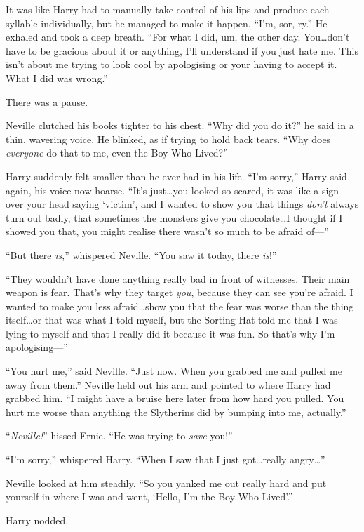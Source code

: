 It was like Harry had to manually take control of his lips and produce each syllable individually, but he managed to make it happen. “I’m, sor, ry.” He exhaled and took a deep breath. “For what I did, um, the other day. You…don’t have to be gracious about it or anything, I’ll understand if you just hate me. This isn’t about me trying to look cool by apologising or your having to accept it. What I did was wrong.”

There was a pause.

Neville clutched his books tighter to his chest. “Why did you do it?” he said in a thin, wavering voice. He blinked, as if trying to hold back tears. “Why does \emph{everyone} do that to me, even the Boy-Who-Lived?”

Harry suddenly felt smaller than he ever had in his life. “I’m sorry,” Harry said again, his voice now hoarse. “It’s just…you looked so scared, it was like a sign over your head saying ‘victim’, and I wanted to show you that things \emph{don’t} always turn out badly, that sometimes the monsters give you chocolate…I thought if I showed you that, you might realise there wasn’t so much to be afraid of—”

“But there \emph{is},” whispered Neville. “You saw it today, there \emph{is}!”

“They wouldn’t have done anything really bad in front of witnesses. Their main weapon is fear. That’s why they target \emph{you}, because they can see you’re afraid. I wanted to make you less afraid…show you that the fear was worse than the thing itself…or that was what I told myself, but the Sorting Hat told me that I was lying to myself and that I really did it because it was fun. So that’s why I’m apologising—”

“You hurt me,” said Neville. “Just now. When you grabbed me and pulled me away from them.” Neville held out his arm and pointed to where Harry had grabbed him. “I might have a bruise here later from how hard you pulled. You hurt me worse than anything the Slytherins did by bumping into me, actually.”

“\emph{Neville!}” hissed Ernie. “He was trying to \emph{save} you!”

“I’m sorry,” whispered Harry. “When I saw that I just got…really angry…”

Neville looked at him steadily. “So you yanked me out really hard and put yourself in where I was and went, ‘Hello, I’m the Boy-Who-Lived’.”

Harry nodded.

